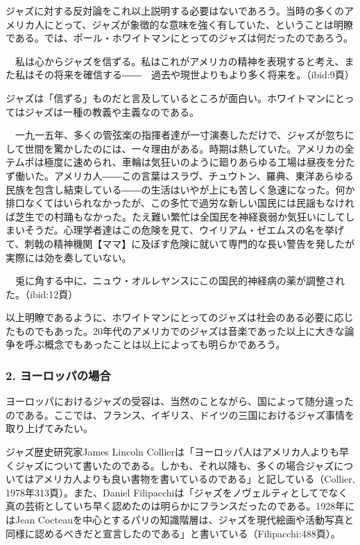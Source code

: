 ジャズに対する反対論をこれ以上説明する必要はないであろう。当時の多くのアメリカ人にとって、ジャズが象徴的な意味を強く有していた、ということは明瞭である。では、ポール・ホワイトマンにとってのジャズは何だったのであろう。

\begin{gquote}
　私は心からジャズを信ずる。私はこれがアメリカの精神を表現すると考え、また私はその将来を確信する――　過去や現世よりもより多く将来を。（ibid:9頁）
\end{gquote}

ジャズは「信ずる」ものだと言及しているところが面白い。ホワイトマンにとってはジャズは一種の教義や主義なのである。

\begin{gquote}
　一九一五年、多くの管弦楽の指揮者達が一寸演奏しただけで、ジャズが忽ちにして世間を驚かしたのには、一々理由がある。時期は熱していた。アメリカの全テムポは極度に速められ、車輪は気狂いのように廻りあらゆる工場は昼夜を分たず働いた。アメリカ人――この言葉はスラヴ、チュウトン、羅典、東洋あらゆる民族を包含し結束している――の生活はいやが上にも苦しく急速になった。何か排口なくてはいられなかったが、この多忙で過労な新しい国民には民謡もなければ芝生での村踊もなかった。たえ難い繁忙は全国民を神経衰弱か気狂いにしてしまいそうだ。心理学者達はこの危険を見て、ウイリアム・ゼエムスの名を挙げて、刺戟の精神機関【ママ】に及ぼす危険に就いて専門的な長い警告を発したが実際には効を奏していない。\par{}　兎に角する中に、ニュウ・オルレヤンスにこの国民的神経病の薬が調整された。（ibid:12頁）
\end{gquote}

以上明瞭であるように、ホワイトマンにとってのジャズは社会のある必要に応じたものでもあった。20年代のアメリカでのジャズは音楽であった以上に大きな論争を呼ぶ概念でもあったことは以上によっても明らかであろう。

\subsubsection{2. ヨーロッパの場合}

ヨーロッパにおけるジャズの受容は、当然のことながら、国によって随分違ったのである。ここでは、フランス、イギリス、ドイツの三国におけるジャズ事情を取り上げてみたい。

ジャズ歴史研究家James Lincoln Collierは「ヨーロッパ人はアメリカ人よりも早くジャズについて書いたのである。しかも、それ以降も、多くの場合ジャズについてはアメリカ人よりも良い書物を書いているのである」と記している（Collier, 1978年313頁）。また、Daniel Filipacchiは「ジャズをノヴェルティとしてでなく真の芸術としていち早く認めたのは明らかにフランスだったのである。1928年にはJean Cocteauを中心とするパリの知識階層は、ジャズを現代絵画や活動写真と同様に認めるべきだと宣言したのである」と書いている（Filipacchi:488頁）。

